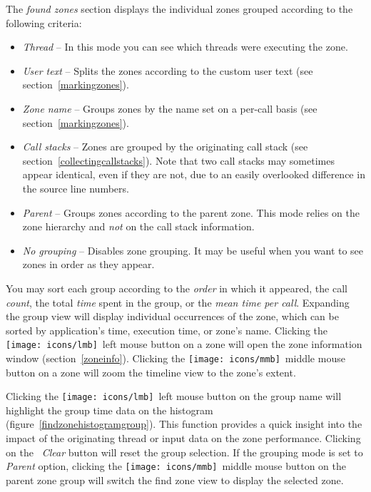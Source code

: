 \documentclass[hidelinks,titlepage,a4paper,twoside]{article}
\newcommand{\LMB}{\texttt{[image: icons/lmb]}}
\newcommand{\MMB}{\texttt{[image: icons/mmb]}}
\begin{document}
The \emph{found zones} section displays the individual zones grouped according to the following criteria:

\begin{itemize}
\item \emph{Thread} -- In this mode you can see which threads were executing the zone.
\item \emph{User text} -- Splits the zones according to the custom user text (see section~\ref{markingzones}).
\item \emph{Zone name} -- Groups zones by the name set on a per-call basis (see section~\ref{markingzones}).
\item \emph{Call stacks} -- Zones are grouped by the originating call stack (see section~\ref{collectingcallstacks}). Note that two call stacks may sometimes appear identical, even if they are not, due to an easily overlooked difference in the source line numbers.
\item \emph{Parent} -- Groups zones according to the parent zone. This mode relies on the zone hierarchy and \emph{not} on the call stack information.
\item \emph{No grouping} -- Disables zone grouping. It may be useful when you want to see zones in order as they appear.
\end{itemize}

You may sort each group according to the \emph{order} in which it appeared, the call \emph{count}, the total \emph{time} spent in the group, or the \emph{mean time per call}. Expanding the group view will display individual occurrences of the zone, which can be sorted by application's time, execution time, or zone's name. Clicking the \LMB{}~left mouse button on a zone will open the zone information window (section~\ref{zoneinfo}). Clicking the \MMB{}~middle mouse button on a zone will zoom the timeline view to the zone's extent.

Clicking the \LMB{}~left mouse button on the group name will highlight the group time data on the histogram (figure~\ref{findzonehistogramgroup}). This function provides a quick insight into the impact of the originating thread or input data on the zone performance. Clicking on the \emph{\faBackspace~Clear} button will reset the group selection. If the grouping mode is set to \emph{Parent} option, clicking the \MMB{}~middle mouse button on the parent zone group will switch the find zone view to display the selected zone.
\end{document}
